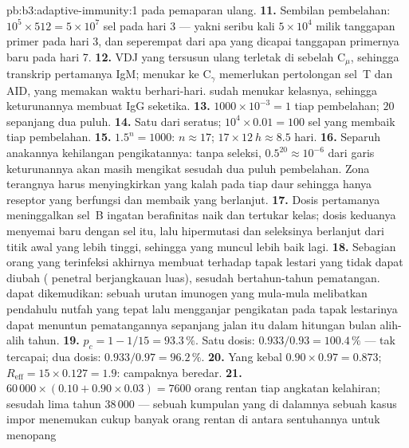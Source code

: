 \begin{solution}{pb:b3:adaptive-immunity:1}
pada pemaparan ulang.
\textbf{11.} Sembilan pembelahan: $10^{5}\times 512 = 5\times 10^{7}$ sel pada
hari 3 --- yakni seribu kali $5\times 10^{4}$ milik tanggapan primer pada hari 3, dan
seperempat dari apa yang dicapai tanggapan primernya baru pada hari 7.
\textbf{12.} VDJ yang tersusun ulang terletak di sebelah C$_{\mu}$, sehingga transkrip
pertamanya IgM; menukar ke C$_{\gamma}$ memerlukan pertolongan sel~T dan AID,
yang memakan waktu berhari-hari.  sudah menukar kelasnya, sehingga keturunannya
membuat IgG seketika.
\textbf{13.} $1000\times 10^{-3} = 1$ tiap pembelahan; $20$ sepanjang dua puluh.
\textbf{14.} Satu dari seratus; $10^{4}\times 0.01 = 100$ sel yang membaik
tiap pembelahan.
\textbf{15.} $1.5^{n} = 1000$: $n \approx 17$; $17\times \qty{12}{h}
\approx 8.5$ hari.
\textbf{16.} Separuh anakannya kehilangan pengikatannya: tanpa seleksi, $0.5^{20}
\approx 10^{-6}$ dari garis keturunannya akan masih mengikat sesudah dua puluh
pembelahan. Zona terangnya harus menyingkirkan yang kalah pada tiap daur sehingga
hanya reseptor yang berfungsi dan membaik yang berlanjut.
\textbf{17.} Dosis pertamanya meninggalkan sel~B ingatan berafinitas naik dan
tertukar kelas; dosis keduanya menyemai  baru dengan sel itu,
lalu hipermutasi dan seleksinya berlanjut dari titik awal yang lebih tinggi,
sehingga  yang muncul lebih baik lagi.
\textbf{18.} Sebagian orang yang terinfeksi akhirnya membuat  terhadap
tapak lestari yang tidak dapat diubah  ( penetral
berjangkauan luas), sesudah bertahun-tahun pematangan.  dapat
dikemudikan: sebuah urutan imunogen yang mula-mula melibatkan pendahulu nutfah
yang tepat lalu mengganjar pengikatan pada tapak lestarinya dapat menuntun
pematangannya sepanjang jalan itu dalam hitungan bulan alih-alih tahun.
\textbf{19.} $p_{c} = 1 - 1/15 = 93.3\,\%$. Satu dosis: $0.933/0.93 =
100.4\,\%$ --- tak tercapai; dua dosis: $0.933/0.97 = 96.2\,\%$.
\textbf{20.} Yang kebal $0.90\times 0.97 = 0.873$; $R_{\text{eff}} = 15\times
0.127 = 1.9$: campaknya beredar.
\textbf{21.} $60\,000\times (0.10 + 0.90\times 0.03) = 7600$ orang rentan
tiap angkatan kelahiran; sesudah lima tahun $38\,000$ --- sebuah kumpulan yang di dalamnya sebuah
kasus impor menemukan cukup banyak orang rentan di antara sentuhannya untuk menopang

\end{solution}
